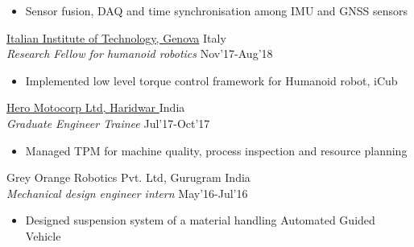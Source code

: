 \documentclass[letterpaper]{twentysecondcv} %
\begin{document}

\begin{itemize}%
	\item Sensor fusion, DAQ and time synchronisation among IMU and GNSS sensors
\end{itemize}

\href{https://iit.it/}{Italian Institute of Technology, Genova} \hfill \faMapMarker \hspace{0.02pt} Italy\\
{\sl Research Fellow for humanoid robotics}  \hfill Nov'17-Aug'18



\begin{itemize}%
	\item  Implemented low level torque control framework for Humanoid robot, iCub

\end{itemize}

\href{https://www.heromotocorp.com/en-in/}{Hero Motocorp Ltd, Haridwar %
} \hfill \faMapMarker \hspace{0.02pt} India\\
{\sl Graduate Engineer Trainee} \hfill Jul'17-Oct'17



\begin{itemize}%
	\item Managed TPM for machine quality, process inspection and resource planning


\end{itemize}
Grey Orange Robotics Pvt. Ltd, Gurugram \hfill \faMapMarker \hspace{0.02pt} India\\
{\sl Mechanical design engineer intern} \hfill May'16-Jul'16
\begin{itemize}%
	\item Designed suspension system of a material handling Automated Guided Vehicle
\end{itemize}
\end{document}
